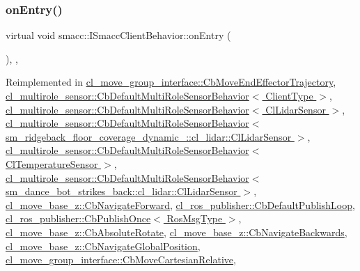 \subsubsection{\texorpdfstring{on\+Entry()}{onEntry()}}
{\footnotesize\ttfamily virtual void smacc\+::\+I\+Smacc\+Client\+Behavior\+::on\+Entry (\begin{DoxyParamCaption}{ }\end{DoxyParamCaption})\hspace{0.3cm}{\ttfamily [inline]}, {\ttfamily [protected]}, {\ttfamily [virtual]}}



Reimplemented in \hyperlink{classcl__move__group__interface_1_1CbMoveEndEffectorTrajectory_aaedd074fd178c6390a4a3f1ccff23ad3}{cl\+\_\+move\+\_\+group\+\_\+interface\+::\+Cb\+Move\+End\+Effector\+Trajectory}, \hyperlink{classcl__multirole__sensor_1_1CbDefaultMultiRoleSensorBehavior_a5ac29f93cc91e23715f51ade94467cae}{cl\+\_\+multirole\+\_\+sensor\+::\+Cb\+Default\+Multi\+Role\+Sensor\+Behavior$<$ Client\+Type $>$}, \hyperlink{classcl__multirole__sensor_1_1CbDefaultMultiRoleSensorBehavior_a5ac29f93cc91e23715f51ade94467cae}{cl\+\_\+multirole\+\_\+sensor\+::\+Cb\+Default\+Multi\+Role\+Sensor\+Behavior$<$ Cl\+Lidar\+Sensor $>$}, \hyperlink{classcl__multirole__sensor_1_1CbDefaultMultiRoleSensorBehavior_a5ac29f93cc91e23715f51ade94467cae}{cl\+\_\+multirole\+\_\+sensor\+::\+Cb\+Default\+Multi\+Role\+Sensor\+Behavior$<$ sm\+\_\+ridgeback\+\_\+floor\+\_\+coverage\+\_\+dynamic\+\_\+::cl\+\_\+lidar\+::\+Cl\+Lidar\+Sensor $>$}, \hyperlink{classcl__multirole__sensor_1_1CbDefaultMultiRoleSensorBehavior_a5ac29f93cc91e23715f51ade94467cae}{cl\+\_\+multirole\+\_\+sensor\+::\+Cb\+Default\+Multi\+Role\+Sensor\+Behavior$<$ Cl\+Temperature\+Sensor $>$}, \hyperlink{classcl__multirole__sensor_1_1CbDefaultMultiRoleSensorBehavior_a5ac29f93cc91e23715f51ade94467cae}{cl\+\_\+multirole\+\_\+sensor\+::\+Cb\+Default\+Multi\+Role\+Sensor\+Behavior$<$ sm\+\_\+dance\+\_\+bot\+\_\+strikes\+\_\+back\+::cl\+\_\+lidar\+::\+Cl\+Lidar\+Sensor $>$}, \hyperlink{classcl__move__base__z_1_1CbNavigateForward_af9a2e49071de287922c3f5963a079b95}{cl\+\_\+move\+\_\+base\+\_\+z\+::\+Cb\+Navigate\+Forward}, \hyperlink{classcl__ros__publisher_1_1CbDefaultPublishLoop_a6e6cfb477cbefc510ca7b55a061545e4}{cl\+\_\+ros\+\_\+publisher\+::\+Cb\+Default\+Publish\+Loop}, \hyperlink{classcl__ros__publisher_1_1CbPublishOnce_afaed71bc2694ec1837278d5f931a76e1}{cl\+\_\+ros\+\_\+publisher\+::\+Cb\+Publish\+Once$<$ Ros\+Msg\+Type $>$}, \hyperlink{classcl__move__base__z_1_1CbAbsoluteRotate_a10418ea360809fa649d295716b152b2b}{cl\+\_\+move\+\_\+base\+\_\+z\+::\+Cb\+Absolute\+Rotate}, \hyperlink{classcl__move__base__z_1_1CbNavigateBackwards_a545a5282f0ef6b0080b46002d6037567}{cl\+\_\+move\+\_\+base\+\_\+z\+::\+Cb\+Navigate\+Backwards}, \hyperlink{classcl__move__base__z_1_1CbNavigateGlobalPosition_a66d8b0555ef2945bc108dcd5171be292}{cl\+\_\+move\+\_\+base\+\_\+z\+::\+Cb\+Navigate\+Global\+Position}, \hyperlink{classcl__move__group__interface_1_1CbMoveCartesianRelative_a7d65e3d5fa3f2c7b47d9cbe631f448ad}{cl\+\_\+move\+\_\+group\+\_\+interface\+::\+Cb\+Move\+Cartesian\+Relative}, 